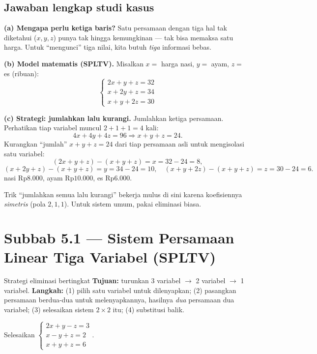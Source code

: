 \subsection*{Jawaban lengkap studi kasus}

\textbf{(a) Mengapa perlu ketiga baris?} Satu persamaan dengan tiga hal tak
diketahui ($x,y,z$) punya tak hingga kemungkinan --- tak bisa memaksa satu harga.
Untuk ``mengunci'' tiga nilai, kita butuh \emph{tiga} informasi bebas.

\textbf{(b) Model matematis (SPLTV).} Misalkan $x=$ harga nasi, $y=$ ayam,
$z=$ es (ribuan):
\[
\begin{cases}
2x+y+z=32\\
x+2y+z=34\\
x+y+2z=30
\end{cases}
\]

\textbf{(c) Strategi: jumlahkan lalu kurangi.}
 Jumlahkan ketiga persamaan. Perhatikan tiap variabel muncul
$2+1+1=4$ kali:
\[
4x+4y+4z=96 \Rightarrow x+y+z=24.
\]
 Kurangkan ``jumlah'' $x+y+z=24$ dari tiap persamaan asli untuk
mengisolasi satu variabel:
\[
(2x+y+z)-(x+y+z)=x=32-24=8,
\]
\[
(x+2y+z)-(x+y+z)=y=34-24=10,\quad
(x+y+2z)-(x+y+z)=z=30-24=6.
\]
\jadi nasi Rp$8.000$, ayam Rp$10.000$, es Rp$6.000$.

\begin{tips}
Trik ``jumlahkan semua lalu kurangi'' bekerja mulus di sini karena koefisiennya
\emph{simetris} (pola $2,1,1$). Untuk sistem umum, pakai eliminasi biasa.
\end{tips}

\section*{Subbab 5.1 — Sistem Persamaan Linear Tiga Variabel (SPLTV)}

\begin{ingat}{Strategi eliminasi bertingkat}
\textbf{Tujuan:} turunkan 3 variabel $\to$ 2 variabel $\to$ 1 variabel.
\textbf{Langkah:} (1) pilih satu variabel untuk dilenyapkan; (2) pasangkan
persamaan berdua-dua untuk melenyapkannya, hasilnya \emph{dua} persamaan dua
variabel; (3) selesaikan sistem $2\times2$ itu; (4) substitusi balik.
\end{ingat}

\begin{soalbox}{}
Selesaikan $\begin{cases} 2x+y-z=3\\ x-y+z=2\\ x+y+z=6\end{cases}$.
\end{soalbox}

